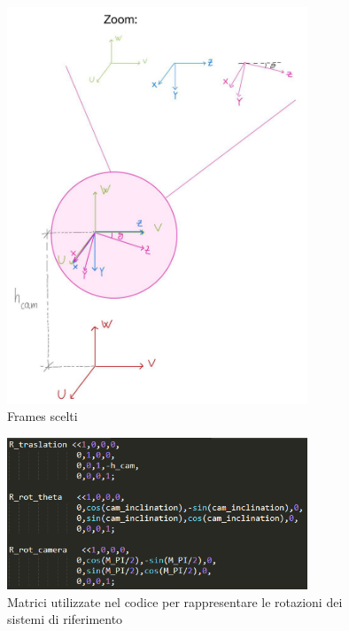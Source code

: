 \begin{figure}[H]
	\centering
	\includegraphics[width=0.8\textwidth]{Immagini/frames.jpg}
	\caption{Frames scelti}
	\label{fig:frames}
\end{figure}

\begin{figure}[H]
	\centering
	\includegraphics[width=0.8\textwidth]{Immagini/rotationInCode.png}
	\caption{Matrici utilizzate nel codice per rappresentare le rotazioni dei sistemi di riferimento}
	\label{fig:framesInCode}
\end{figure}
